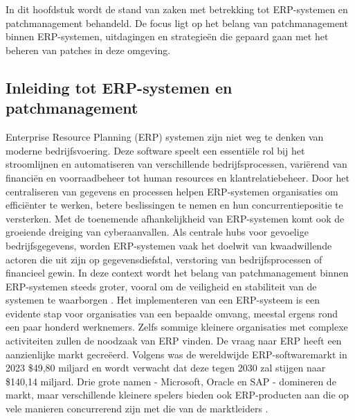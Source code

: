 \chapter{}
\label{ch:stand-van-zaken}


In dit hoofdstuk wordt de stand van zaken met betrekking tot ERP-systemen en patchmanagement behandeld. De focus ligt op het belang van patchmanagement binnen ERP-systemen, uitdagingen en strategieën die gepaard gaan met het beheren van patches in deze omgeving.

\section{Inleiding tot ERP-systemen en patchmanagement}
Enterprise Resource Planning (ERP) systemen zijn niet weg te denken van moderne bedrijfsvoering. Deze software speelt een essentiële rol bij het stroomlijnen en automatiseren van verschillende bedrijfsprocessen, variërend van financiën en voorraadbeheer tot human resources en klantrelatiebeheer.
Door het centraliseren van gegevens en processen helpen ERP-systemen organisaties om efficiënter te werken, betere beslissingen te nemen en hun concurrentiepositie te versterken. Met de toenemende afhankelijkheid van ERP-systemen komt ook de groeiende dreiging van cyberaanvallen. Als centrale hubs voor gevoelige bedrijfsgegevens, worden ERP-systemen vaak het doelwit van
kwaadwillende actoren die uit zijn op gegevensdiefstal, verstoring van bedrijfsprocessen of financieel gewin. In deze context wordt het belang van patchmanagement binnen ERP-systemen steeds groter, vooral om de veiligheid en stabiliteit van de systemen te waarborgen \autocite{Pearson2024}.
Het implementeren van een ERP-systeem is een evidente stap voor organisaties van een bepaalde omvang, meestal ergens rond een paar honderd werknemers. Zelfs sommige kleinere organisaties met complexe activiteiten zullen de noodzaak van ERP vinden. De vraag
naar ERP heeft een aanzienlijke markt gecreëerd. Volgens \textcite{Madh2024} was de wereldwijde ERP-softwaremarkt in 2023 \$49,80 miljard en wordt verwacht dat deze tegen 2030 zal stijgen naar \$140,14 miljard. Drie grote namen -
Microsoft, Oracle en SAP - domineren de markt, maar verschillende kleinere spelers bieden ook ERP-producten aan die op vele manieren concurrerend zijn met die van de marktleiders \autocite{Pratt2023}.

